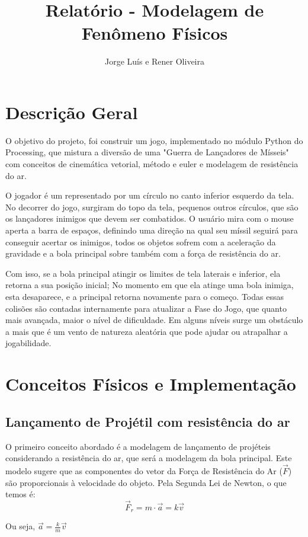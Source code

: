\documentclass[12pt,letterpaper]{article}
\title{Relatório - Modelagem de Fenômeno Físicos}
\author{Jorge Luís e Rener Oliveira}
\begin{document}
\maketitle

\section*{Descrição Geral}

O objetivo do projeto, foi construir um jogo, implementado no módulo Python do Processing, que mistura a diversão de uma "Guerra de Lançadores de Mísseis" com conceitos de cinemática vetorial, método e euler e modelagem de resistência do ar.

O jogador é um representado por um círculo no canto inferior esquerdo da tela. No decorrer do jogo, surgiram do topo da tela, pequenos outros círculos, que são os lançadores inimigos que devem ser combatidos. O usuário mira com o mouse aperta a barra de espaços, definindo uma direção na qual seu míssil seguirá para conseguir acertar os inimigos, todos os objetos sofrem com a aceleração da gravidade e a bola principal sobre também com a força de resistência do ar. 

Com isso, se a bola principal atingir os limites de tela laterais e inferior, ela retorna a sua posição inicial; No momento em que ela atinge uma bola inimiga, esta desaparece, e a principal retorna novamente para o começo. Todas essas colisões são contadas internamente para atualizar a Fase do Jogo, que quanto mais avançada, maior o nível de dificuldade. Em alguns níveis surge um obstáculo a mais que é um vento de natureza aleatória que pode ajudar ou atrapalhar a jogabilidade.

\section*{Conceitos Físicos e Implementação}
\subsection*{Lançamento de Projétil com resistência do ar}
O primeiro conceito abordado é a modelagem de lançamento de projéteis considerando a resistência do ar, que será a modelagem da bola principal. Este modelo sugere que as componentes do vetor da Força de Resistência do Ar ($\vec{F}$) são proporcionais à velocidade do objeto. Pela Segunda Lei de Newton, o que temos é:
$$\vec{F}_r=m\cdot\vec{a}=k\vec{v}$$

Ou seja, $\vec{a}=\displaystyle\frac k m \vec{v}$
\end{document}
